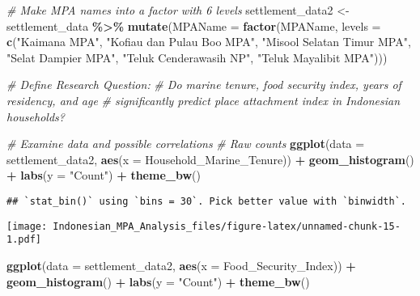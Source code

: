 \documentclass[
]{article}
\newenvironment{Shaded}{\begin{snugshade}}{\end{snugshade}}
\newcommand{\AttributeTok}[1]{\textcolor[rgb]{0.13,0.29,0.53}{#1}}
\newcommand{\CommentTok}[1]{\textcolor[rgb]{0.56,0.35,0.01}{\textit{#1}}}
\newcommand{\FunctionTok}[1]{\textcolor[rgb]{0.13,0.29,0.53}{\textbf{#1}}}
\newcommand{\NormalTok}[1]{#1}
\newcommand{\OtherTok}[1]{\textcolor[rgb]{0.56,0.35,0.01}{#1}}
\newcommand{\SpecialCharTok}[1]{\textcolor[rgb]{0.81,0.36,0.00}{\textbf{#1}}}
\newcommand{\StringTok}[1]{\textcolor[rgb]{0.31,0.60,0.02}{#1}}
\begin{document}
\begin{Shaded}
\begin{Highlighting}[]
\CommentTok{\# Make MPA names into a factor with 6 levels}
\NormalTok{settlement\_data2 }\OtherTok{\textless{}{-}}\NormalTok{ settlement\_data }\SpecialCharTok{\%\textgreater{}\%} 
  \FunctionTok{mutate}\NormalTok{(}\AttributeTok{MPAName =} \FunctionTok{factor}\NormalTok{(MPAName, }\AttributeTok{levels =} \FunctionTok{c}\NormalTok{(}\StringTok{"Kaimana MPA"}\NormalTok{,}
                                              \StringTok{"Kofiau dan Pulau Boo MPA"}\NormalTok{,}
                                              \StringTok{"Misool Selatan Timur MPA"}\NormalTok{,}
                                              \StringTok{"Selat Dampier MPA"}\NormalTok{,}
                                              \StringTok{"Teluk Cenderawasih NP"}\NormalTok{,}
                                              \StringTok{"Teluk Mayalibit MPA"}\NormalTok{)))}

\CommentTok{\# Define Research Question:}
\CommentTok{\# Do marine tenure, food security index, years of residency, and age}
\CommentTok{\# significantly predict place attachment index in Indonesian households?}

\CommentTok{\# Examine data and possible correlations}
\CommentTok{\# Raw counts}
\FunctionTok{ggplot}\NormalTok{(}\AttributeTok{data =}\NormalTok{ settlement\_data2, }\FunctionTok{aes}\NormalTok{(}\AttributeTok{x =}\NormalTok{ Household\_Marine\_Tenure)) }\SpecialCharTok{+}
  \FunctionTok{geom\_histogram}\NormalTok{() }\SpecialCharTok{+}
  \FunctionTok{labs}\NormalTok{(}\AttributeTok{y =} \StringTok{"Count"}\NormalTok{) }\SpecialCharTok{+}
  \FunctionTok{theme\_bw}\NormalTok{()}
\end{Highlighting}
\end{Shaded}

\begin{verbatim}
## `stat_bin()` using `bins = 30`. Pick better value with `binwidth`.
\end{verbatim}

\texttt{[image: Indonesian\_MPA\_Analysis\_files/figure-latex/unnamed-chunk-15-1.pdf]}

\begin{Shaded}
\begin{Highlighting}[]
\FunctionTok{ggplot}\NormalTok{(}\AttributeTok{data =}\NormalTok{ settlement\_data2, }\FunctionTok{aes}\NormalTok{(}\AttributeTok{x =}\NormalTok{ Food\_Security\_Index)) }\SpecialCharTok{+}
  \FunctionTok{geom\_histogram}\NormalTok{() }\SpecialCharTok{+}
  \FunctionTok{labs}\NormalTok{(}\AttributeTok{y =} \StringTok{"Count"}\NormalTok{) }\SpecialCharTok{+}
  \FunctionTok{theme\_bw}\NormalTok{()}
\end{Highlighting}
\end{Shaded}
\end{document}

